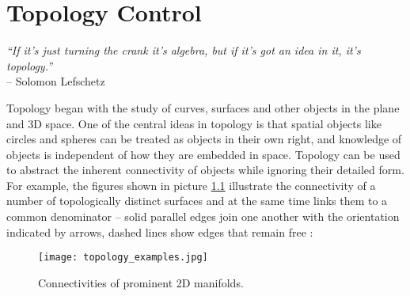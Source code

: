 \chapter{Topology Control}
\label{math0}

\begin{flushright}
\textit{``If it's just turning the crank it's algebra, but if it's got an idea in it, it's topology.''}\\
-- Solomon Lefschetz
\end{flushright}

Topology began with the study of curves, surfaces and other objects in the plane and 3D space.
One of the central ideas in topology is that spatial objects like circles and spheres can be treated as objects in their own right, and knowledge of objects is independent of how they are embedded in space.
Topology can be used to abstract the inherent connectivity of objects while ignoring their detailed form.\\
For example, the figures shown in picture \ref{fig:topology_examples} illustrate the connectivity of a number of topologically distinct surfaces and at the same time links them to a common denominator -- solid parallel edges join one another with the orientation indicated by arrows, dashed lines show edges that remain free \citep[][cf. p.1]{Weisstein2012}:
\begin{figure}[ht]
\centering
\texttt{[image: topology\_examples.jpg]}
\caption{Connectivities of prominent 2D manifolds.}
\label{fig:topology_examples}
\end{figure}

